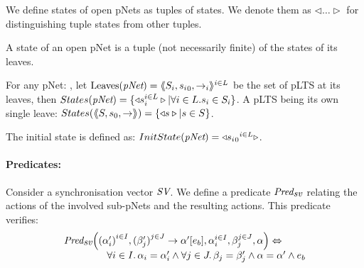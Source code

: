 \documentclass{lncs/llncs}
\begin{document}
%

We define states of open pNets as tuples of states. We denote them
 as $\triangleleft\ldots\triangleright$ for distinguishing tuple 
states from other tuples.
\begin{definition}\label{def-states}
  A state of an open pNet is a tuple (not necessarily finite) of the
  states of its leaves.

  For any pNet: \pNet, let $\Leaves(\pNet) = \mylangle S_i,{s_i}_0, \to_i\myrangle^{i \in L}$ be 
  the set of pLTS at its leaves,
  then $States(\pNet) = \{\triangleleft s_i^{i\in L}
  \triangleright| \forall i\in L. s_i \in S_i\}$.
A pLTS being its own single leave:
  $States(\langle\hspace{-0.58ex}\langle S,s_0, \to\rangle\hspace{-0.58ex}\rangle) = \{\triangleleft s \triangleright| s \in S\}$.

The initial state is defined as:
$InitState(\pNet) = \triangleleft {{s_i}_0}^{i\in L}  \triangleright$.
\end{definition}




\paragraph{Predicates:}
Consider a synchronisation vector $\symb{SV}$. We 
define a
predicate $\Predsv$ relating
the actions of the involved sub-pNets and the resulting actions. This predicate verifies:
\[\begin{array}{l}\Predsv \Big(\SV{{(\alpha'_i)}^{i\in I}, {(\beta'_j)}^{j\in J}} 
{\alpha'} 
{e_b}, \alpha_i^{i\in I}, \beta_j^{j\in J}, \alpha\Big)\Leftrightarrow \\~\qquad\qquad%
%
\forall i\in I.\, \alpha_i=\alpha'_i\land \forall j \in J.\, \beta_j=\beta'_j \land 
\alpha=\alpha' 
\land e_b
\end{array} 
\]
\end{document}
